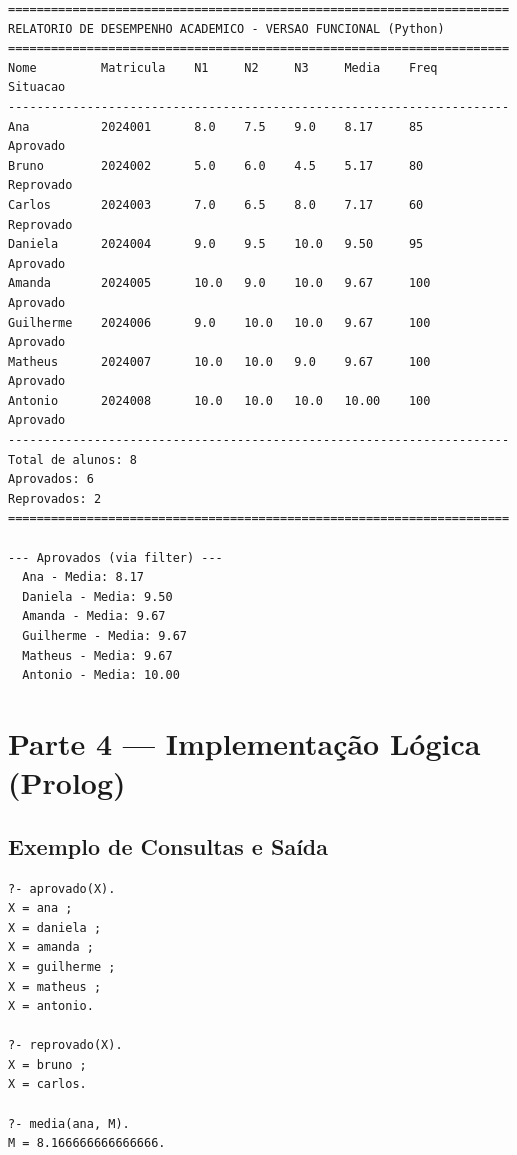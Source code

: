 \documentclass[12pt, a4paper]{article}
\begin{document}
\begin{lstlisting}[style=output]
======================================================================
RELATORIO DE DESEMPENHO ACADEMICO - VERSAO FUNCIONAL (Python)
======================================================================
Nome         Matricula    N1     N2     N3     Media    Freq   Situacao
----------------------------------------------------------------------
Ana          2024001      8.0    7.5    9.0    8.17     85     Aprovado
Bruno        2024002      5.0    6.0    4.5    5.17     80     Reprovado
Carlos       2024003      7.0    6.5    8.0    7.17     60     Reprovado
Daniela      2024004      9.0    9.5    10.0   9.50     95     Aprovado
Amanda       2024005      10.0   9.0    10.0   9.67     100    Aprovado
Guilherme    2024006      9.0    10.0   10.0   9.67     100    Aprovado
Matheus      2024007      10.0   10.0   9.0    9.67     100    Aprovado
Antonio      2024008      10.0   10.0   10.0   10.00    100    Aprovado
----------------------------------------------------------------------
Total de alunos: 8
Aprovados: 6
Reprovados: 2
======================================================================

--- Aprovados (via filter) ---
  Ana - Media: 8.17
  Daniela - Media: 9.50
  Amanda - Media: 9.67
  Guilherme - Media: 9.67
  Matheus - Media: 9.67
  Antonio - Media: 10.00
\end{lstlisting}

\section{Parte 4 --- Implementação Lógica (Prolog)}



\subsection{Exemplo de Consultas e Saída}

\begin{lstlisting}[style=output]
?- aprovado(X).
X = ana ;
X = daniela ;
X = amanda ;
X = guilherme ;
X = matheus ;
X = antonio.

?- reprovado(X).
X = bruno ;
X = carlos.

?- media(ana, M).
M = 8.166666666666666.
\end{lstlisting}
\end{document}

